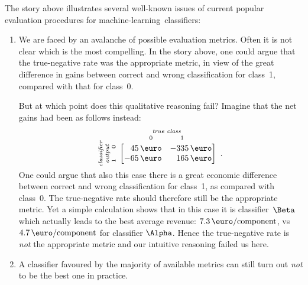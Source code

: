 \documentclass[\ifafour a4paper,12pt,\else a5paper,10pt,\fi%
onecolumn,oneside,article,%
british%
]{memoir}
\theoremstyle{remark}
\theoremstyle{innote}
\renewcommand*{\|}[1][]{\nonscript\:#1\vert\nonscript\:\mathopen{}}
\newcommand*{\ml}{machine-learning}
\begin{document}
The story above illustrates several well-known issues of current popular evaluation procedures for \ml\ classifiers:
\begin{enumerate}%
\item We are faced by an avalanche of possible evaluation metrics. Often it is not clear which is the most compelling. In the story above, one could argue that the true-negative rate was the appropriate metric, in view of the great difference in gains between correct and wrong classification for class~1, compared with that for class~0.

  But at which point does this qualitative reasoning fail? Imagine that the net gains had been as follows instead:
\begin{equation}
  \label{eq:utility_example_2}
  \rotatebox[origin=c]{90}{
    \clap{\textit{\parbox{5em}{\centering\scriptsize classifier\\output\\$1\hspace{1.5em}0$}}
    }}\ 
    \overbracket[0pt]{
      \begin{bmatrix*}[r]
        45\,\text{\texteuro} & -335\,\text{\texteuro}  \\
        -65\,\text{\texteuro} & 165\,\text{\texteuro}
      \end{bmatrix*}}^{
      \clap{\textit{\parbox{6em}{\centering\scriptsize true class\\$0\hspace{4em}1$}}
    }} \ .
\end{equation}
One could argue that also this case there is a great economic difference between correct and wrong classification for class~1, as compared with class~0. The true-negative rate should therefore still be the appropriate metric. Yet a simple calculation shows that in this case it is classifier~$\Beta$ which actually leads to the best average revenue: $7.3\,\text{\texteuro/component}$, vs $4.7\,\text{\texteuro/component}$ for classifier $\Alpha$. Hence the true-negative rate is \emph{not} the appropriate metric and our intuitive reasoning failed us here.


\item A classifier favoured by the majority of available metrics can still turn out \emph{not} to be the best one in practice.


\end{enumerate}
\end{document}
